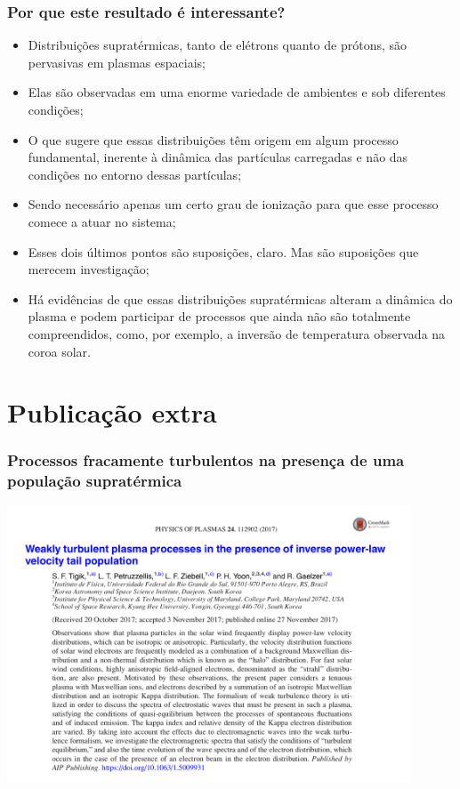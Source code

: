 \documentclass[10pt,aspectratio=1610,lualatex]{beamer}
\begin{document}
\begin{frame}
  \frametitle{Por que este resultado é interessante?}
  \begin{itemize}
    \item Distribuições supratérmicas, tanto de elétrons quanto de prótons,
    são pervasivas em plasmas espaciais;
    \vspace{0.1cm}
    \pause
    \item Elas são observadas em uma enorme variedade de ambientes e sob
    diferentes condições;
    \vspace{0.1cm}
    \pause
    \item O que sugere que essas distribuições têm origem em algum
    processo fundamental, inerente à dinâmica das partículas carregadas
    e não das condições no entorno dessas partículas;
    \vspace{0.1cm}
    \pause
    \item Sendo necessário apenas um certo grau de ionização para que
    esse processo comece a atuar no sistema;
    \vspace{0.1cm}
    \pause
    \item Esses dois últimos pontos são suposições, claro. Mas são suposições
    que merecem investigação;
    \vspace{0.1cm}
    \pause
    \item Há evidências de que essas distribuições supratérmicas alteram a dinâmica
    do plasma e podem participar de processos que ainda não são totalmente
    compreendidos, como, por exemplo, a inversão de temperatura observada na coroa
    solar.
  \end{itemize}
\end{frame}

\section{Publicação extra}
\begin{frame}
  \frametitle{Processos fracamente turbulentos na presença de
    uma população supratérmica}
   \centering \includegraphics[width=0.9\textwidth]{print_Tigik2017b.png}
\end{frame}
\end{document}
